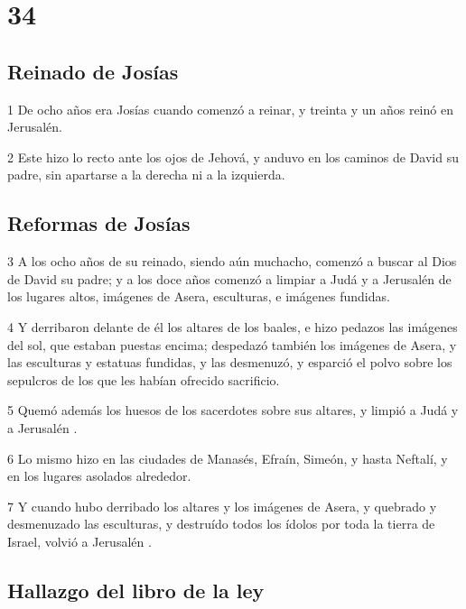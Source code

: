 \chapter{34}

\section*{Reinado de Josías}

\par 1 De ocho años era Josías cuando comenzó a reinar, y treinta y un años reinó en Jerusalén. 
\par 2 Este hizo lo recto ante los ojos de Jehová, y anduvo en los caminos de David su padre, sin apartarse a la derecha ni a la izquierda.

\section*{Reformas de Josías}

\par 3 A los ocho años de su reinado, siendo aún muchacho, comenzó a buscar al Dios de David su padre; y a los doce años comenzó a limpiar a Judá y a Jerusalén  de los lugares altos, imágenes de Asera, esculturas, e imágenes fundidas.
\par 4 Y derribaron delante de él los altares de los baales, e hizo pedazos las imágenes del sol, que estaban puestas encima; despedazó también los imágenes de Asera, y las esculturas y estatuas fundidas, y las desmenuzó, y esparció el polvo sobre los sepulcros de los que les habían ofrecido sacrificio.
\par 5 Quemó además los huesos de los sacerdotes sobre sus altares, y limpió a Judá y a Jerusalén .
\par 6 Lo mismo hizo en las ciudades de Manasés, Efraín, Simeón, y hasta Neftalí, y en los lugares asolados alrededor.
\par 7 Y cuando hubo derribado los altares y los imágenes de Asera, y quebrado y desmenuzado las esculturas, y destruído todos los ídolos por toda la tierra de Israel, volvió a Jerusalén .

\section*{Hallazgo del libro de la ley}

